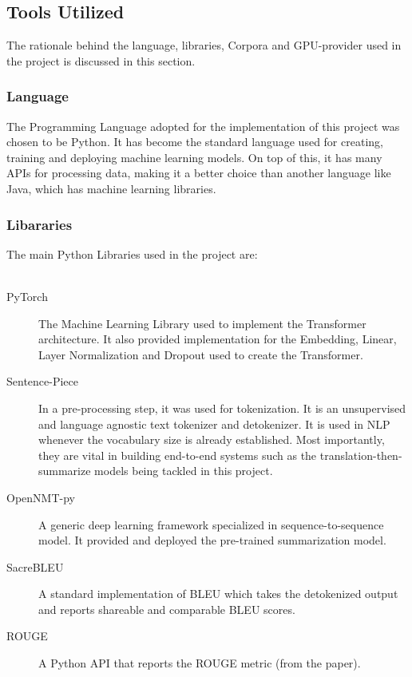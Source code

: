 \documentclass[12pt,a4paper,twoside,openright]{report}
\begin{document}
\subsection{Tools Utilized}
\label{tools-utilized}

The rationale behind the language, libraries, Corpora and GPU-provider used in the project is discussed in this section.

\subsubsection{Language}
The Programming Language adopted for the implementation of this project was chosen to be Python. It has become the standard language used for creating, training and deploying machine learning models. On top of this, it has many APIs for processing data, making it a better choice than another language like Java, which has machine learning libraries.

\subsubsection{Libararies}
The main Python Libraries used in the project are:
\\\\
\begin{description}
\item[PyTorch \cite{torch}]
The Machine Learning Library used to implement the Transformer architecture. It also provided implementation for the Embedding, Linear, Layer Normalization and Dropout used to create the Transformer.
\item[Sentence-Piece \cite{sentencepiece}]
In a pre-processing step, it was used for tokenization. It is an unsupervised and language agnostic text tokenizer and detokenizer. It is used in NLP whenever the vocabulary size is already established. Most importantly, they are vital in building end-to-end systems such as the translation-then-summarize models being tackled in this project.
\item[OpenNMT-py]
A generic deep learning framework specialized in sequence-to-sequence model. It provided and deployed the pre-trained summarization model.
\item[SacreBLEU \cite{sacrebleu}]
A standard implementation of BLEU \cite{bleu} which takes the detokenized output and reports shareable and comparable BLEU scores.
\item[ROUGE]
A Python API that reports the ROUGE metric (from the paper\cite{rouge}).

\end{description}
\end{document}
